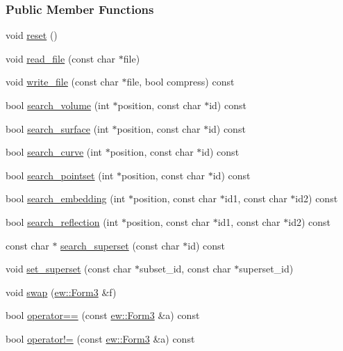 \subsubsection*{Public Member Functions}
\begin{DoxyCompactItemize}
\item 
void \hyperlink{classew_1_1Form3_a142e4923377ce451364f9c902713372c}{reset} ()
\item 
void \hyperlink{classew_1_1Form3_a9de2d04fa5fd964de69951339ed9c1cf}{read\_\-file} (const char $\ast$file)
\item 
void \hyperlink{classew_1_1Form3_ab5abad2f912616bc7d0a1e3dd37943bb}{write\_\-file} (const char $\ast$file, bool compress) const 
\item 
bool \hyperlink{classew_1_1Form3_ad3f7f4ab0210f7753dc42df94fec817d}{search\_\-volume} (int $\ast$position, const char $\ast$id) const 
\item 
bool \hyperlink{classew_1_1Form3_a863b953b1d79be8c29406cde111b4d6e}{search\_\-surface} (int $\ast$position, const char $\ast$id) const 
\item 
bool \hyperlink{classew_1_1Form3_acef9a7cb9f65ccc4a7ed70c9968441ca}{search\_\-curve} (int $\ast$position, const char $\ast$id) const 
\item 
bool \hyperlink{classew_1_1Form3_a1da8c7154ae6a6bbe904034c9fdbb8df}{search\_\-pointset} (int $\ast$position, const char $\ast$id) const 
\item 
bool \hyperlink{classew_1_1Form3_ac2ce9094d917d97a7424edae355c8328}{search\_\-embedding} (int $\ast$position, const char $\ast$id1, const char $\ast$id2) const 
\item 
bool \hyperlink{classew_1_1Form3_a593bc0c4f71b5f24afee1d55ac07302e}{search\_\-reflection} (int $\ast$position, const char $\ast$id1, const char $\ast$id2) const 
\item 
const char $\ast$ \hyperlink{classew_1_1Form3_a7fa5b81fa3813eb833155e3d5cb7e2f3}{search\_\-superset} (const char $\ast$id) const 
\item 
void \hyperlink{classew_1_1Form3_a0918a426ed95d3244d8212dc985d0897}{set\_\-superset} (const char $\ast$subset\_\-id, const char $\ast$superset\_\-id)
\item 
void \hyperlink{classew_1_1Form3_ae15e78e95043b8e7f196a32e7d4527a6}{swap} (\hyperlink{classew_1_1Form3}{ew::Form3} \&f)
\item 
bool \hyperlink{classew_1_1Form3_a7704ee4daef7adf30a0199756b2fcc22}{operator==} (const \hyperlink{classew_1_1Form3}{ew::Form3} \&a) const 
\item 
bool \hyperlink{classew_1_1Form3_a002e398fca7517dfacc077a1450190d0}{operator!=} (const \hyperlink{classew_1_1Form3}{ew::Form3} \&a) const 
\end{DoxyCompactItemize}
